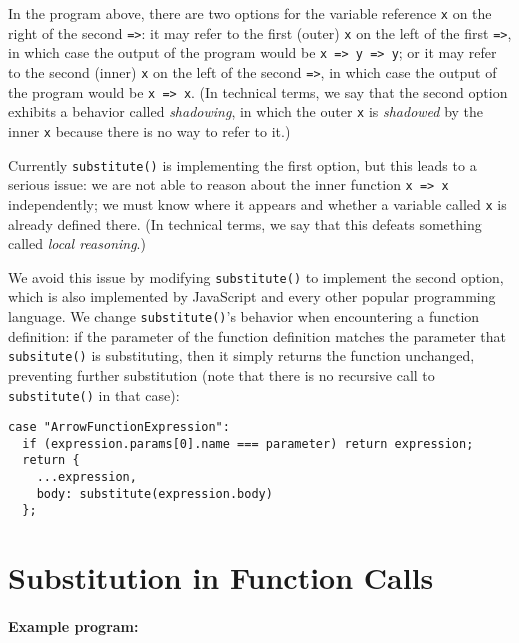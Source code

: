 \documentclass[12pt, oneside]{book}
\begin{document}
In the program above, there are two options for the variable reference \texttt{x} on the right of the second \texttt{=>}: it may refer to the first (outer) \texttt{x} on the left of the first \texttt{=>}, in which case the output of the program would be \texttt{x => y => y}; or it may refer to the second (inner) \texttt{x} on the left of the second \texttt{=>}, in which case the output of the program would be \texttt{x => x}. (In technical terms, we say that the second option exhibits a behavior called \emph{shadowing}, in which the outer \texttt{x} is \emph{shadowed} by the inner \texttt{x} because there is no way to refer to it.)

Currently \texttt{substitute()} is implementing the first option, but this leads to a serious issue: we are not able to reason about the inner function \texttt{x => x} independently; we must know where it appears and whether a variable called \texttt{x} is already defined there. (In technical terms, we say that this defeats something called \emph{local reasoning}.)

We avoid this issue by modifying \texttt{substitute()} to implement the second option, which is also implemented by JavaScript and every other popular programming language. We change \texttt{substitute()}’s behavior when encountering a function definition: if the parameter of the function definition matches the parameter that \texttt{subsitute()} is substituting, then it simply returns the function unchanged, preventing further substitution (note that there is no recursive call to \texttt{substitute()} in that case):

\begin{verbatim}
case "ArrowFunctionExpression":
  if (expression.params[0].name === parameter) return expression;
  return {
    ...expression,
    body: substitute(expression.body)
  };
\end{verbatim}

\section{Substitution in Function Calls}

\paragraph{Example program:}
\end{document}

